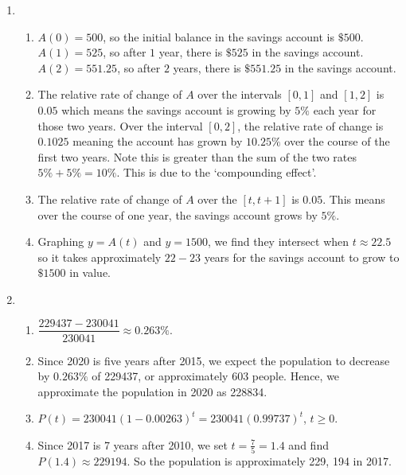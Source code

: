 \begin{enumerate}
\item  \begin{enumerate}

\item   $A(0) = 500$, so the initial balance in the savings account is $\$500$.  $A(1) = 525$, so after $1$ year, there is $\$525$ in the savings account.   $A(2) =551.25$, so after $2$ years, there is $\$551.25$ in the savings account. 

\item  The relative rate of change of $A$ over the intervals $[0,1]$ and $[1,2]$ is $0.05$ which means the savings account is growing by $5 \%$ each year for those two years.  Over the interval $[0,2]$, the relative rate of change is $0.1025$ meaning the account has grown by $10.25 \%$ over the course of the first two years.  Note this is greater than the sum of the two rates $5 \% + 5 \% = 10 \%$.  This is due to the `compounding effect'.

\item  The relative rate of change of $A$ over the $[t, t+1]$ is $0.05$. This means over the course of one year, the savings account grows by $5 \%$.

\item Graphing $y= A(t)$ and $y = 1500$, we find they intersect when $t \approx 22.5$ so it takes approximately $22-23$ years for the savings account to grow to $\$1500$ in value.

\end{enumerate}

\item  \begin{enumerate}

\item $\dfrac{229437-230041}{230041} \approx 0.263 \%$.

\item  Since 2020 is five years after 2015, we expect the population to decrease by  $0.263 \%$ of 229437, or approximately 603 people.  Hence, we approximate the population in 2020 as 228834.

\item  $P(t) = 230041(1-0.00263)^t = 230041(0.99737)^{t}$, $t \geq 0$.

\item  Since 2017 is 7 years after 2010, we set $t = \frac{7}{5} = 1.4$ and find $P(1.4) \approx 229194$.  So the population is approximately 229, 194 in 2017.  


\end{enumerate}
\end{enumerate}
